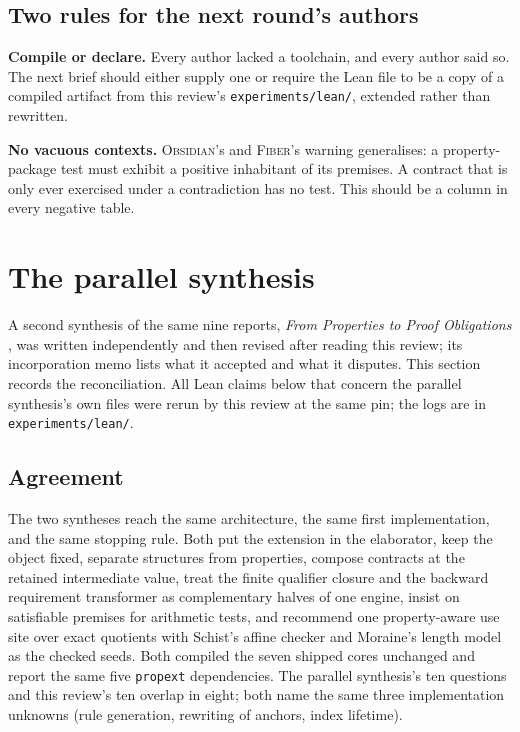\documentclass[11pt,a4paper]{article}
\newcommand{\code}[1]{\nolinkurl{#1}}
\newcommand{\Fb}{\textsc{Fiber}}
\newcommand{\Ob}{\textsc{Obsidian}}
\theoremstyle{definition}
\begin{document}
\subsection{Two rules for the next round's authors}
\textbf{Compile or declare.} Every author lacked a toolchain, and every author said so. The next brief should either supply one or require the Lean file to be a copy of a compiled artifact from this review's \code{experiments/lean/}, extended rather than rewritten.

\textbf{No vacuous contexts.} \Ob's and \Fb's warning generalises: a property-package test must exhibit a positive inhabitant of its premises. A contract that is only ever exercised under a contradiction has no test. This should be a column in every negative table.

\section{The parallel synthesis}\label{sec:parallel}
A second synthesis of the same nine reports, \emph{From Properties to Proof Obligations} \cite{syn-3}, was written independently and then revised after reading this review; its incorporation memo lists what it accepted and what it disputes. This section records the reconciliation. All Lean claims below that concern the parallel synthesis's own files were rerun by this review at the same pin; the logs are in \code{experiments/lean/}.

\subsection{Agreement}
The two syntheses reach the same architecture, the same first implementation, and the same stopping rule. Both put the extension in the elaborator, keep the object fixed, separate structures from properties, compose contracts at the retained intermediate value, treat the finite qualifier closure and the backward requirement transformer as complementary halves of one engine, insist on satisfiable premises for arithmetic tests, and recommend one property-aware use site over exact quotients with Schist's affine checker and Moraine's length model as the checked seeds. Both compiled the seven shipped cores unchanged and report the same five \code{propext} dependencies. The parallel synthesis's ten questions and this review's ten overlap in eight; both name the same three implementation unknowns (rule generation, rewriting of anchors, index lifetime).
\end{document}

